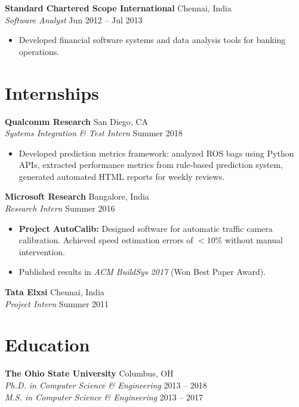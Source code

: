 \documentclass[10pt,letterpaper]{article}
\begin{document}
\textbf{Standard Chartered Scope International} \hfill Chennai, India \\
\textit{Software Analyst} \hfill Jun 2012 -- Jul 2013
\begin{itemize}
    \item Developed financial software systems and data analysis tools for banking operations.
\end{itemize}

\section{Internships}

\textbf{Qualcomm Research} \hfill San Diego, CA \\
\textit{Systems Integration \& Test Intern} \hfill Summer 2018
\begin{itemize}
    \item Developed prediction metrics framework: analyzed ROS bags using Python APIs, extracted performance metrics from rule-based prediction system, generated automated HTML reports for weekly reviews.
\end{itemize}

\textbf{Microsoft Research} \hfill Bangalore, India \\
\textit{Research Intern} \hfill Summer 2016
\begin{itemize}
    \item \textbf{Project AutoCalib:} Designed software for automatic traffic camera calibration. Achieved speed estimation errors of $<10\%$ without manual intervention.
    \item Published results in \textit{ACM BuildSys 2017} (Won Best Paper Award).
\end{itemize}

\textbf{Tata Elxsi} \hfill Chennai, India \\
\textit{Project Intern} \hfill Summer 2011

\section{Education}
\textbf{The Ohio State University} \hfill Columbus, OH \\
\textit{Ph.D. in Computer Science \& Engineering} \hfill 2013 -- 2018 \\
\textit{M.S. in Computer Science \& Engineering} \hfill 2013 -- 2017
\end{document}
